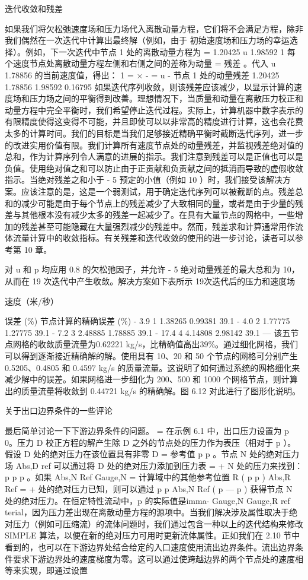 \documentclass[11pt,a4paper,openany,fontset=none]{ctexbook}
\begin{document}
迭代收敛和残差

如果我们将欠松弛速度场和压力场代入离散动量方程，它们将不会满足方程，除非我们偶然在一次迭代中计算出最终解（例如，由于
初始速度场和压力场的幸运选择）。例如，下一次迭代中节点 1 处的离散动量方程为 = 1.20425 u 1.98592 1 每个速度节点处离散动量方程左侧和右侧之间的差称为动量 = 残差 。代入 u 1.78856 的当前速度值，得出： 1 = × - = u - 节点 1 处的动量残差 1.20425 1.78856 1.98592 0.16795
如果迭代序列收敛，则该残差应该减少，以显示计算的速度场和压力场之间的平衡得到改善。理想情况下，当质量和动量在离散压力校正和动量方程中完全平衡时，我们希望停止迭代过程。实际上，计算机器中数字表示的有限精度使得这变得不可能，并且即使可以以非常高的精度进行计算，这也会花费太多的计算时间。我们的目标是当我们足够接近精确平衡时截断迭代序列，进一步的改进实用价值有限。我们计算所有速度节点处的动量残差，并监视残差绝对值的总和，作为计算序列令人满意的进展的指示。我们注意到残差可以是正值也可以是负值。使用绝对值之和可以防止由于正贡献和负贡献之间的抵消而导致的虚假收敛指示。当绝对残差之和小于 - 5 预定的小值（例如 10 ）时，我们接受该解决方案。应该注意的是，这是一个弱测试，用于确定迭代序列可以被截断的点。残差总和的减少可能是由于每个节点上的残差减少了大致相同的量，或者是由于少量的残差与其他根本没有减少太多的残差一起减少了。在具有大量节点的网格中，一些增加的残差甚至可能隐藏在大量强烈减少的残差中。然而，残差求和计算通常用作流体流量计算中的收敛指标。有关残差和迭代收敛的使用的进一步讨论，读者可以参考第 10 章。

对 u 和 p 均应用 0.8 的欠松弛因子，并允许 - 5 绝对动量残差的最大总和为 10，从而在 19 次迭代中产生收敛。解决方案如下表所示
19次迭代后的压力和速度场

速度（米/秒）

误差 (\%) 节点计算的精确误差 (\%) - 3.9 1 1.38265 0.99381 39.1 - 4.0 2 1.77775 1.27775 39.1 - 7.2 3 2.48885 1.78885 39.1 - 17.4 4 4.14808 2.98142 39.1 —
该五节点网格的收敛质量流量为0.62221 kg/s，比精确值高出39\%。通过细化网格，我们可以得到逐渐接近精确解的解。使用具有 10、20 和 50 个节点的网格可分别产生 0.5205、0.4805 和 0.4597 kg/s 的质量流量。这说明了如何通过系统的网格细化来减少解中的误差。如果网格进一步细化为 200、500 和 1000 个网格节点，则计算出的质量流量将收敛到 0.44721 kg/s 的精确解。图 6.12 对此进行了图形化说明。

关于出口边界条件的一些评论

最后简单讨论一下下游边界条件的问题。 = 在示例 6.1 中，出口压力设置为 p 0。压力 D 校正方程的解产生除 D 之外的节点处的压力作为表压（相对于 p ）。假设 D 处的绝对压力在该位置具有非零 D = 参考值 p p 。节点 N 处的绝对压力场 Abs,D ref 可以通过将 D 处的绝对压力添加到压力表 = + N 处的压力来找到： p p p 。如果 Abs,N Ref Gauge,N = 计算域中的其他参考位置 R ( p p ) Abs,R Ref = + 处的绝对压力已知，则可以通过 p p Abs,N Ref ( p — p ) 获得节点 N 处的绝对压力。在恒定特性流动中，p 的实际值是imma- Gauge,N Gauge,R ref terial，因为压力差出现在离散动量方程的源项中。当我们解决涉及属性取决于绝对压力（例如可压缩流）的流体问题时，我们通过包含一种以上的迭代结构来修改 SIMPLE 算法，以便在新的绝对压力可用时更新流体属性。正如我们在 2.10 节中看到的，也可以在下游边界处结合给定的入口速度使用流出边界条件。流出边界条件要求下游边界处的速度梯度为零。这可以通过使跨越边界的两个节点处的速度相等来实现，即通过设置
\end{document}
